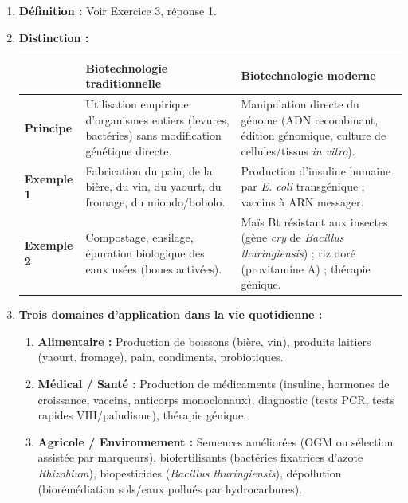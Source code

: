 \documentclass[11pt]{article}
\begin{document}
\begin{corrige}
\begin{enumerate}
\item \textbf{Définition :} Voir Exercice 3, réponse 1.
\item \textbf{Distinction :}
\begin{center}
\begin{tabularx}{\linewidth}{|l|X|X|}\hline
 & \textbf{Biotechnologie traditionnelle} & \textbf{Biotechnologie moderne} \\ \hline
\textbf{Principe} & Utilisation empirique d'organismes entiers (levures, bactéries) sans modification génétique directe. & Manipulation directe du génome (ADN recombinant, édition génomique, culture de cellules/tissus \emph{in vitro}). \\ \hline
\textbf{Exemple 1} & Fabrication du pain, de la bière, du vin, du yaourt, du fromage, du miondo/bobolo. & Production d'insuline humaine par \emph{E. coli} transgénique ; vaccins à ARN messager. \\ \hline
\textbf{Exemple 2} & Compostage, ensilage, épuration biologique des eaux usées (boues activées). & Maïs Bt résistant aux insectes (gène \emph{cry} de \emph{Bacillus thuringiensis}) ; riz doré (provitamine A) ; thérapie génique. \\ \hline
\end{tabularx}
\end{center}
\item \textbf{Trois domaines d'application dans la vie quotidienne :}
\begin{enumerate}
\item \textbf{Alimentaire :} Production de boissons (bière, vin), produits laitiers (yaourt, fromage), pain, condiments, probiotiques.
\item \textbf{Médical / Santé :} Production de médicaments (insuline, hormones de croissance, vaccins, anticorps monoclonaux), diagnostic (tests PCR, tests rapides VIH/paludisme), thérapie génique.
\item \textbf{Agricole / Environnement :} Semences améliorées (OGM ou sélection assistée par marqueurs), biofertilisants (bactéries fixatrices d'azote \emph{Rhizobium}), biopesticides (\emph{Bacillus thuringiensis}), dépollution (biorémédiation sols/eaux pollués par hydrocarbures).
\end{enumerate}
\end{enumerate}
\end{corrige}
\end{document}

